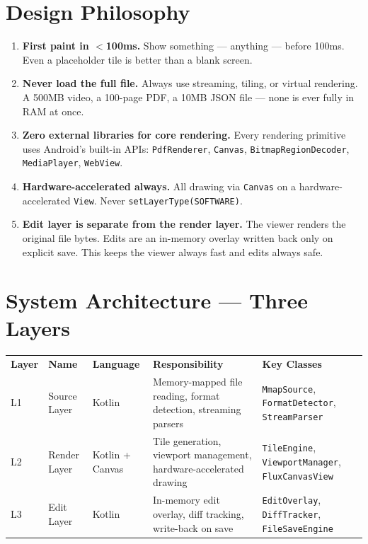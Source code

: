 \documentclass[12pt,a4paper]{report}
\newcommand{\ra}[1]{\renewcommand{\arraystretch}{#1}}
\newcommand{\TH}[1]{\rowcolor{P1}\color{white}\bfseries #1}
\begin{document}
\section{Design Philosophy}

\begin{pbox}
\begin{enumerate}[leftmargin=1.4em,topsep=2pt,itemsep=5pt]
\item \textbf{First paint in $<$100ms.} Show something — anything — before
  100ms. Even a placeholder tile is better than a blank screen.
\item \textbf{Never load the full file.} Always use streaming, tiling, or
  virtual rendering. A 500MB video, a 100-page PDF, a 10MB JSON file — none
  is ever fully in RAM at once.
\item \textbf{Zero external libraries for core rendering.} Every rendering
  primitive uses Android's built-in APIs: \texttt{PdfRenderer}, \texttt{Canvas},
  \texttt{BitmapRegionDecoder}, \texttt{MediaPlayer}, \texttt{WebView}.
\item \textbf{Hardware-accelerated always.} All drawing via \texttt{Canvas} on a
  hardware-accelerated \texttt{View}. Never \texttt{setLayerType(SOFTWARE)}.
\item \textbf{Edit layer is separate from the render layer.} The viewer renders
  the original file bytes. Edits are an in-memory overlay written back only on
  explicit save. This keeps the viewer always fast and edits always safe.
\end{enumerate}
\end{pbox}

\section{System Architecture — Three Layers}

\begin{center}\ra{1.4}
\begin{tabular}{C{0.8cm} L{2.6cm} L{3.2cm} L{4.0cm} L{4.2cm}}
\TH{Layer} & \TH{Name} & \TH{Language} & \TH{Responsibility} & \TH{Key Classes} \\
 L1 & Source Layer & Kotlin & Memory-mapped file reading, format detection, streaming parsers &
  \texttt{MmapSource}, \texttt{FormatDetector}, \texttt{StreamParser} \\
 L2 & Render Layer & Kotlin + Canvas & Tile generation, viewport management, hardware-accelerated drawing &
  \texttt{TileEngine}, \texttt{ViewportManager}, \texttt{FluxCanvasView} \\
 L3 & Edit Layer & Kotlin & In-memory edit overlay, diff tracking, write-back on save &
  \texttt{EditOverlay}, \texttt{DiffTracker}, \texttt{FileSaveEngine} \\
\end{tabular}
\end{center}
\end{document}
